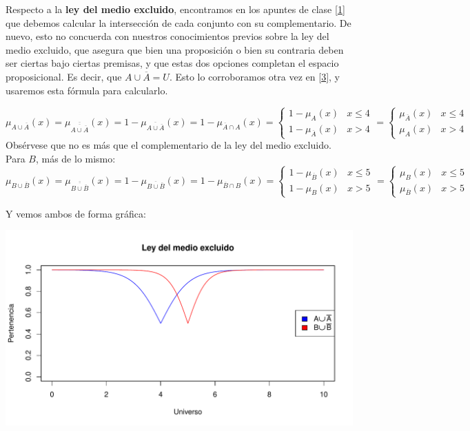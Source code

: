 \documentclass[
]{article}
\begin{document}
Respecto a la \textbf{ley del medio excluido}, encontramos en los
apuntes de clase {[}\protect\hyperlink{ref-PalmaConjuntosBorrosos}{1}{]}
que debemos calcular la intersección de cada conjunto con su
complementario. De nuevo, esto no concuerda con nuestros conocimientos
previos sobre la ley del medio excluido, que asegura que bien una
proposición o bien su contraria deben ser ciertas bajo ciertas premisas,
y que estas dos opciones completan el espacio proposicional. Es decir,
que \(A\cup \overline{A}=U\). Esto lo corroboramos otra vez en
{[}\protect\hyperlink{ref-Stanford}{3}{]}, y usaremos esta fórmula para
calcularlo.

\[\mu_{A\cup\overline{A}}\left(x\right)=\mu_{\overline{\overline{A\cup\overline{A}}}}\left(x\right)=1-\mu_{\overline{A\cup\overline{A}}}\left(x\right)=1-\mu_{\overline{A}\cap A}\left(x\right)=\begin{cases}
1-\mu_{A}\left(x\right) & x\leq4\\
1-\mu_{\overline{A}}\left(x\right) & x>4
\end{cases}=\begin{cases}
\mu_{\overline{A}}\left(x\right) & x\leq4\\
\mu_{A}\left(x\right) & x>4
\end{cases}\] Obsérvese que no es más que el complementario de la ley
del medio excluido. Para \(B\), más de lo mismo:
\[\mu_{B\cup\overline{B}}\left(x\right)=\mu_{\overline{\overline{B\cup\overline{B}}}}\left(x\right)=1-\mu_{\overline{B\cup\overline{B}}}\left(x\right)=1-\mu_{\overline{B}\cap B}\left(x\right)=\begin{cases}
1-\mu_{\overline{B}}\left(x\right) & x\leq5\\
1-\mu_{B}\left(x\right) & x>5
\end{cases}=\begin{cases}
\mu_{B}\left(x\right) & x\leq5\\
\mu_{\overline{B}}\left(x\right) & x>5
\end{cases}\]

Y vemos ambos de forma gráfica:

\includegraphics{tareaBloque3_files/figure-latex/unnamed-chunk-9-1.pdf}
\newpage
\end{document}

